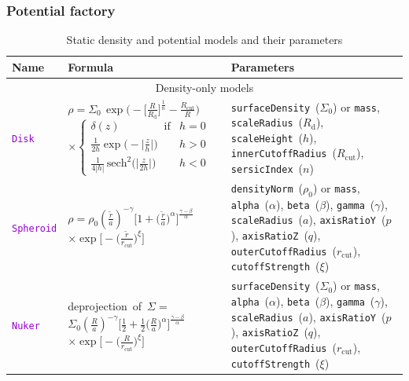 \documentclass[12pt]{article}
\newcommand{\ttt}[1]{\textcolor{darkviolet}{\texttt{#1}}}
\newcommand{\ppp}[1]{\textcolor{darkolive} {\texttt{#1}}}
\begin{document}
\subsubsection{Potential factory}  \label{sec:PotentialFactory}

\begin{table}
\caption{Static density and potential models and their parameters}  \label{tab:PotentialParams}
\hspace{-2mm}\begin{tabular}{l m{50mm} >{\raggedright\arraybackslash}m{80mm}}
Name & Formula & Parameters \\
\hline
\multicolumn{3}{c}{Density-only models} \\

\ttt{Disk} & $\rho = \Sigma_0\,\exp\big(-\big[\frac{R}{R_\mathrm{d}}\big]^{\frac1n} - \frac{R_\mathrm{cut}}{R}\big)$
$\times\left\{ \begin{array}{ll} \delta(z)\qquad\qquad\mbox{if} & h=0 \\[1mm]
\frac{1}{2h} \exp\big(-\big|\frac{z}{h}\big|\big) & h>0 \\[1mm]
\frac{1}{4|h|}\, \mathrm{sech}^2\big(\big|\frac{z}{2h}\big|\big) & h<0 \end{array} \right. $ &
\ppp{surfaceDensity}~($\Sigma_0$) or \ppp{mass}, \ppp{scaleRadius}~($R_\mathrm{d}$), \ppp{scaleHeight}~($h$), \ppp{innerCutoffRadius}~($R_\mathrm{cut}$), \ppp{sersicIndex}~($n$)\\

\ttt{Spheroid} & $\rho = \rho_0  \left(\frac{\tilde r}{a}\right)^{-\gamma} \Big[ 1 + \big(\frac{\tilde r}{a}\big)^\alpha \Big]^{\frac{\gamma-\beta}{\alpha}}$ $\times \exp\Big[ -\big(\frac{\tilde r}{r_\mathrm{cut}}\big)^\xi\Big] $ &
\ppp{densityNorm}~($\rho_0$) or \ppp{mass}, \ppp{alpha}~($\alpha$), \ppp{beta}~($\beta$), \ppp{gamma}~($\gamma$), \ppp{scaleRadius}~($a$), \ppp{axisRatioY}~($p$), \ppp{axisRatioZ}~($q$), \ppp{outerCutoffRadius}~($r_\mathrm{cut}$), \ppp{cutoffStrength}~($\xi$) \\[2mm]

\ttt{Nuker} & \mbox{deprojection of $\Sigma={}$} \mbox{$\Sigma_0 \left(\frac{R}{a}\right)^{-\gamma} \Big[ \frac12 + \frac12\big(\frac{R}{a}\big)^\alpha \Big]^{\frac{\gamma-\beta}{\alpha}}$} $\times \exp\Big[ -\big(\frac{R}{r_\mathrm{cut}}\big)^\xi\Big] $  & \ppp{surfaceDensity}~($\Sigma_0$) or \ppp{mass}, \ppp{alpha}~($\alpha$), \ppp{beta}~($\beta$), \ppp{gamma}~($\gamma$), \ppp{scaleRadius}~($a$), \ppp{axisRatioY}~($p$), \ppp{axisRatioZ}~($q$), \ppp{outerCutoffRadius}~($r_\mathrm{cut}$), \ppp{cutoffStrength}~($\xi$) \\[2mm]


\end{tabular}
\end{table}
\end{document}
